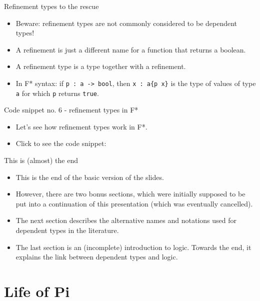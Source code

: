 \documentclass{beamer}
\newcommand{\m}[1]{\texttt{#1}}
\begin{document}
\begin{frame}{Refinement types to the rescue}
\begin{itemize}
    \item Beware: refinement types are not commonly considered to be dependent types!
    \item A refinement is just a different name for a function that returns a boolean.
    \item A refinement type is a type together with a refinement.
    \item In F* syntax: if \m{p :\ a -> bool}, then \m{x :\ a\{p x\}} is the type of values of type \m{a} for which \m{p} returns \m{true}.
\end{itemize}
\end{frame}

\begin{frame}{Code snippet no. 6 - refinement types in F*}
\begin{itemize}
	\item Let's see how refinement types work in F*.
	\item Click to see the code snippet: \href{https://github.com/wkolowski/Dependent-Types-and-Theorem-Proving/blob/master/Code/Refinements.fst}{\color{blue}{Code/Refinements.fst}}
\end{itemize}
\end{frame}

\begin{frame}{This is (almost) the end}
\begin{itemize}
	\item This is the end of the basic version of the slides.
	\item However, there are two bonus sections, which were initially supposed to be put into a continuation of this presentation (which was eventually cancelled).
	\item The next section describes the alternative names and notations used for dependent types in the literature.
	\item The last section is an (incomplete) introduction to logic. Towards the end, it explains the link between dependent types and logic.
\end{itemize}
\end{frame}

\section{Life of Pi}
\end{document}
